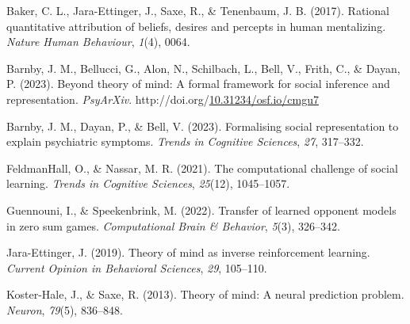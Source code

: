 \documentclass[10pt, letterpaper]{article}
\newlength{\cslhangindent}
\newlength{\cslentryspacingunit} %
\newenvironment{CSLReferences}[2] %
{%
	\setlength{\parindent}{0pt}
	\ifodd #1
	\let\oldpar\par
	\def\par{\hangindent=\cslhangindent\oldpar}
	\fi
}%
{}
\begin{document}
\hypertarget{refs}{}
\begin{CSLReferences}{1}{0}
\leavevmode{}%
Baker, C. L., Jara-Ettinger, J., Saxe, R., \& Tenenbaum, J. B. (2017).
Rational quantitative attribution of beliefs, desires and percepts in
human mentalizing. \emph{Nature Human Behaviour}, \emph{1}(4), 0064.

\leavevmode{}%
Barnby, J. M., Bellucci, G., Alon, N., Schilbach, L., Bell, V., Frith,
C., \& Dayan, P. (2023). Beyond theory of mind: A formal framework for
social inference and representation. \emph{PsyArXiv}.
http://doi.org/\href{https://doi.org/10.31234/osf.io/cmgu7}{10.31234/osf.io/cmgu7}

\leavevmode{}%
Barnby, J. M., Dayan, P., \& Bell, V. (2023). Formalising social
representation to explain psychiatric symptoms. \emph{Trends in
Cognitive Sciences}, \emph{27}, 317--332.

\leavevmode{}%
FeldmanHall, O., \& Nassar, M. R. (2021). The computational challenge of
social learning. \emph{Trends in Cognitive Sciences}, \emph{25}(12),
1045--1057.

\leavevmode{}%
Guennouni, I., \& Speekenbrink, M. (2022). Transfer of learned opponent
models in zero sum games. \emph{Computational Brain \& Behavior},
\emph{5}(3), 326--342.

\leavevmode{}%
Jara-Ettinger, J. (2019). Theory of mind as inverse reinforcement
learning. \emph{Current Opinion in Behavioral Sciences}, \emph{29},
105--110.

\leavevmode{}%
Koster-Hale, J., \& Saxe, R. (2013). Theory of mind: A neural prediction
problem. \emph{Neuron}, \emph{79}(5), 836--848.

\end{CSLReferences}


\end{document}

